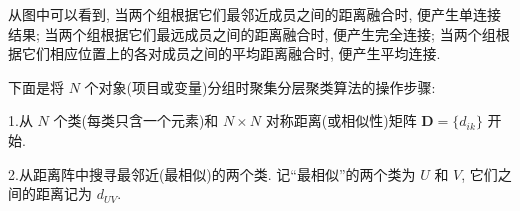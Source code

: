 从图中可以看到, 当两个组根据它们最邻近成员之间的距离融合时, 便产生单连接结果; 当两个组根据它们最远成员之间的距离融合时, 便产生完全连接; 当两个组根据它们相应位置上的各对成员之间的平均距离融合时, 便产生平均连接.

下面是将 $N$ 个对象(项目或变量)分组时聚集分层聚类算法的操作步骤:

1.\quad 从 $N$ 个类(每类只含一个元素)和 $N\times N$ 对称距离(或相似性)矩阵 $\mathbf{D}=\{d_{ik}\}$ 开始.

2.\quad 从距离阵中搜寻最邻近(最相似)的两个类. 记“最相似”的两个类为 $U$ 和 $V$, 它们之间的距离记为 $d_{UV}$.
